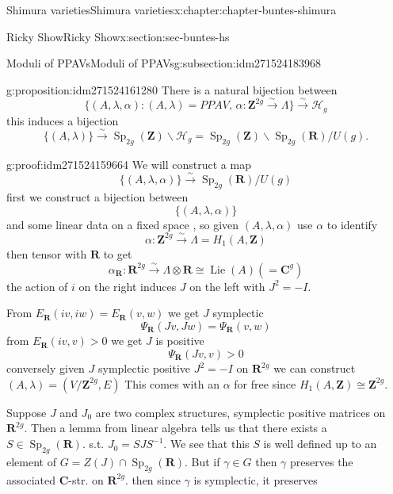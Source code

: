 \documentclass[oneside,10pt,]{book}
\numberwithin{equation}{section}
\DeclareMathOperator{\Lie}{Lie}
\newcommand{\inv}{^{-1}}
\newcommand{\ZZ}{\mathbf{Z}}
\newcommand{\RR}{\mathbf{R}}
\newcommand{\CC}{\mathbf{C}}
\DeclareMathOperator{\Sp}{Sp}
\newcommand{\gt}{>}
\begin{document}
\begin{chapterptx}{Shimura varieties}{}{Shimura varieties}{}{}{x:chapter:chapter-buntes-shimura}
\begin{sectionptx}{Ricky Show}{}{Ricky Show}{}{}{x:section:sec-buntes-hs}
\begin{subsectionptx}{Moduli of PPAVs}{}{Moduli of PPAVs}{}{}{g:subsection:idm271524183968}
\begin{proposition}{}{}{g:proposition:idm271524161280}%
There is a natural bijection between%
\begin{equation*}
\{(A,\lambda, \alpha) : (A,\lambda)= PPAV,\,\alpha\colon \ZZ^{2g} \xrightarrow \sim \Lambda\} \xrightarrow\sim \mathscr H_g
\end{equation*}
this induces a  bijection%
\begin{equation*}
\{(A,\lambda) \} \xrightarrow \sim \Sp_{2g}(\ZZ) \backslash \mathscr H_g = \Sp_{2g}(\ZZ) \backslash \Sp_{2g} (\RR) / U(g)\text{.}
\end{equation*}
%
\end{proposition}
\begin{proofptx}{}{g:proof:idm271524159664}
We will construct a map%
\begin{equation*}
\{(A,\lambda ,\alpha)\} \xrightarrow\sim\Sp_{2g} (\RR)/U(g)
\end{equation*}
first we construct  a bijection between%
\begin{equation*}
\{(A,\lambda, \alpha)\}
\end{equation*}
and some linear data on a fixed space , so given \((A, \lambda, \alpha)\) use \(\alpha\) to identify%
\begin{equation*}
\alpha\colon \ZZ^{2g} \xrightarrow \sim \Lambda = H_1(A,\ZZ)
\end{equation*}
then  tensor with \(\RR\) to get%
\begin{equation*}
\alpha_\RR \colon \RR^{2g} \xrightarrow\sim \Lambda\otimes \RR \cong \Lie(A) (= \CC^g)
\end{equation*}
the action of \(i\) on the right induces \(J\) on the left with \(J^2 = -I\).%
\par
From \(E_\RR(iv,iw) = E_\RR(v,w)\) we get \(J \) symplectic%
\begin{equation*}
\Psi_\RR(Jv, Jw) = \Psi_\RR( v,w)
\end{equation*}
from \(E_\RR(iv,v) \gt 0\) we get \(J\) is positive%
\begin{equation*}
\Psi_\RR(Jv,v) \gt 0
\end{equation*}
conversely given \(J\) symplectic positive \(J^2 = -I\) on \(\RR^{2g}\) we can construct \((A,\lambda) = (V/\ZZ^{2g}, E)\) This comes with an \(\alpha\) for free since \(H_1(A, \ZZ) \cong \ZZ^{2g}\).%
\par
Suppose \(J\) and \(J_0\) are two complex structures, symplectic positive matrices on \(\RR^{2g}\). Then a lemma from linear algebra tells us that there exists a \(S \in \Sp_{2g}(\RR)\). s.t. \(J_0  = S J S \inv\). We see that this \(S\) is well defined up to an element of \(G = Z(J) \cap \Sp_{2g}(\RR)\). But if \(\gamma \in G \) then \(\gamma\) preserves the associated \(\CC\)-str. on \(\RR^{2g}\). then since \(\gamma\) is symplectic, it preserves%

\end{proofptx}
\end{subsectionptx}
\end{sectionptx}
\end{chapterptx}
\end{document}
